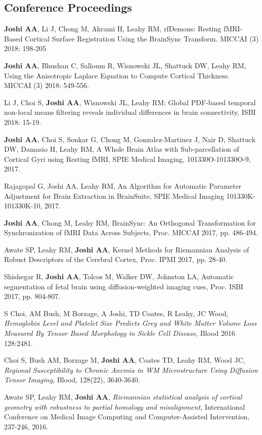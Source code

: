 \documentclass[overlapped,line,letterpaper]{res}
\begin{document}
\begin{resume}
\subsection{Conference Proceedings}

\textbf{Joshi AA}, Li J, Chong M, Akrami H, Leahy RM, rfDemons: Resting fMRI-Based Cortical Surface Registration Using the BrainSync Transform. MICCAI (3) 2018: 198-205

\textbf{Joshi AA}, Bhushan C, Salloum R, Wisnowski JL, Shattuck DW, Leahy RM, Using the Anisotropic Laplace Equation to Compute Cortical Thickness. MICCAI (3) 2018: 549-556. 

Li J, Choi S, \textbf{Joshi AA}, Wisnowski JL, Leahy RM: Global PDF-based temporal non-local means filtering reveals individual differences in brain connectivity,  ISBI 2018: 15-19.

\textbf{Joshi AA}, Choi S, Sonkar G, Chong M,  Gonzalez-Martinez J, Nair D, Shattuck DW,  Damasio H, Leahy RM, A Whole Brain Atlas with Sub-parcellation of Cortical Gyri using Resting fMRI, SPIE Medical Imaging, 101330O-101330O-9, 2017.

Rajagopal G, Joshi AA, Leahy RM, An Algorithm for Automatic Parameter Adjustment for Brain Extraction in BrainSuite,  SPIE Medical Imaging 101330K-101330K-10, 2017.

\textbf{Joshi AA}, Chong M, Leahy RM, BrainSync: An Orthogonal Transformation for Synchronization of fMRI Data Across Subjects, Proc. MICCAI 2017, pp. 486-494.

Awate SP, Leahy RM, \textbf{Joshi AA}, Kernel Methods for Riemannian Analysis of Robust Descriptors of the Cerebral Cortex, Proc. IPMI 2017, pp. 28-40.

Shishegar R, \textbf{Joshi AA}, Tolcos M,  Walker DW, Johnston LA, Automatic segmentation of fetal brain using diffusion-weighted imaging cues, Proc. ISBI 2017, pp. 804-807.

S Choi, AM Bush, M Borzage, A Joshi, TD Coates, R Leahy, JC Wood, \textit{Hemoglobin Level and Platelet Size Predicts Grey and White Matter Volume Loss Measured By Tensor Based Morphology in Sickle Cell Disease}, Blood 2016 128:2481.

Choi S, Bush AM, Borzage M, \textbf{Joshi AA}, Coates TD, Leahy RM, Wood JC, \textit{Regional Susceptibility to Chronic Anemia in WM Microstructure Using Diffusion Tensor Imaging}, Blood, 128(22), 3640-3640. 

Awate SP, Leahy RM, \textbf{Joshi AA}, \textit{Riemannian statistical analysis of cortical geometry with robustness to partial homology and misalignment}, International Conference on Medical Image Computing and Computer-Assisted Intervention, 237-246, 2016.


\end{resume}
\end{document}
